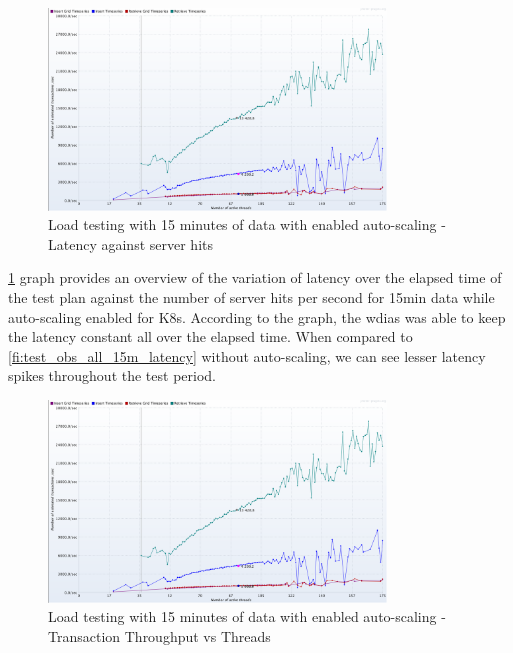 \begin{figure}[htp]
    \centering
    \includegraphics[width=0.8\textwidth]{results/obs/all_auto/obs_all_auto_15m_transaction_throughtput_vs_threads.png}
    \caption{Load testing with 15 minutes of data with enabled auto-scaling - Latency against server hits}
    \label{fi:test_obs_all_auto_15m_latency}
\end{figure}
\cref{fi:test_obs_all_auto_15m_latency} graph provides an overview of the variation of latency over the elapsed time of the test plan against the number of server hits per second for 15min data while auto-scaling enabled for K8s. According to the graph, the \acrshort{wdias} was able to keep the latency constant all over the elapsed time.
When compared to \cref{fi:test_obs_all_15m_latency} without auto-scaling, we can see lesser latency spikes throughout the test period.

\begin{figure}[htp]
    \centering
    \includegraphics[width=0.8\textwidth]{results/obs/all_auto/obs_all_auto_15m_transaction_throughtput_vs_threads.png}
    \caption{Load testing with 15 minutes of data with enabled auto-scaling - Transaction Throughput vs Threads}
    \label{fi:test_obs_all_auto_15m_throughtput}
\end{figure}

